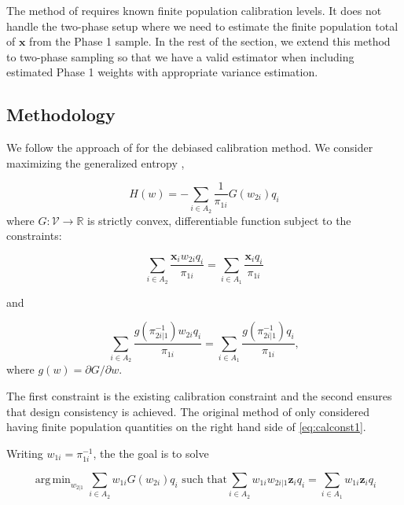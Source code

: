 \documentclass[12pt]{article}
\DeclareMathOperator*{\argmin}{arg\,min}
\newcommand{\R}{\mathbb{R}}
\renewcommand{\bf}[1]{\mathbf{#1}}
\begin{document}
The method of \cite{kwon2024debiased} requires known finite population 
calibration levels. It does not handle the
two-phase setup where we need to estimate the finite population total of $\bf x$
from the Phase 1 sample. In the rest of the section, we extend this method to 
two-phase sampling so that we have a valid 
estimator when including estimated Phase 1 weights with appropriate variance
estimation.

\subsection{Methodology}

We follow the approach of \cite{kwon2024debiased} for the debiased calibration
method. We consider maximizing the generalized entropy \cite{gneiting2007strictly},

\begin{equation}\label{eq:primalloss}
  H(w) = - \sum_{i \in A_2} \frac{1}{\pi_{1i}} G(w_{2i}) q_i
\end{equation}
where $G: \mathcal{V} \to \R$ is strictly convex, differentiable function
subject to the constraints:

\begin{equation}\label{eq:calconst1}
  \sum_{i \in A_2} \frac{\bf x_i w_{2i}q_i}{\pi_{1i}} = 
\sum_{i \in A_1} \frac{\bf x_iq_i}{\pi_{1i}}
\end{equation}

and 

\begin{equation}\label{eq:calconst2}
  \sum_{i \in A_2} \frac{g(\pi_{2i|1}^{-1})w_{2i}q_i}{\pi_{1i}} = 
  \sum_{i \in A_1} \frac{g(\pi_{2i|1}^{-1})q_i}{\pi_{1i}}, 
\end{equation}
where $g(w) = \partial G / \partial w$. 

The first constraint is the existing calibration constraint and the second
ensures that design consistency is achieved. 
The original method of \cite{kwon2024debiased} only considered having finite
population quantities on the right hand side of \eqref{eq:calconst1}.

Writing $w_{1i} = \pi_{1i}^{-1}$, the the goal is to solve

\begin{equation}\label{eq:primal}
  \argmin_{w_{2|1}} \sum_{i \in A_2} w_{1i} G(w_{2i}) q_i 
  \text{ such that}
  \sum_{i \in A_2} w_{1i} w_{2i|1} \bf z_i q_i = \sum_{i \in A_1} w_{1i} \bf z_i q_i
\end{equation}
\end{document}
